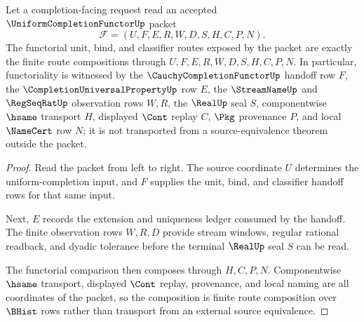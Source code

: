 \begin{theorem}
\label{thm:uniform-completion-functor-functoriality}
Let a completion-facing request read an accepted $\UniformCompletionFunctorUp$ packet
$$
\mathcal{F}=(U,F,E,R,W,D,S,H,C,P,N).
$$
The functorial unit, bind, and classifier routes exposed by the packet are exactly the finite route compositions through $U,F,E,R,W,D,S,H,C,P,N$. In particular, functoriality is witnessed by the $\CauchyCompletionFunctorUp$ handoff row $F$, the $\CompletionUniversalPropertyUp$ row $E$, the $\StreamNameUp$ and $\RegSeqRatUp$ observation rows $W,R$, the $\RealUp$ seal $S$, componentwise $\hsame$ transport $H$, displayed $\Cont$ replay $C$, $\Pkg$ provenance $P$, and local $\NameCert$ row $N$; it is not transported from a source-equivalence theorem outside the packet.
\end{theorem}
\begin{proof}
Read the packet from left to right. The source coordinate $U$ determines the uniform-completion input, and $F$ supplies the unit, bind, and classifier handoff rows for that same input.

Next, $E$ records the extension and uniqueness ledger consumed by the handoff. The finite observation rows $W,R,D$ provide stream windows, regular rational readback, and dyadic tolerance before the terminal $\RealUp$ seal $S$ can be read.

The functorial comparison then composes through $H,C,P,N$. Componentwise $\hsame$ transport, displayed $\Cont$ replay, provenance, and local naming are all coordinates of the packet, so the composition is finite route composition over $\BHist$ rows rather than transport from an external source equivalence.
\end{proof}

